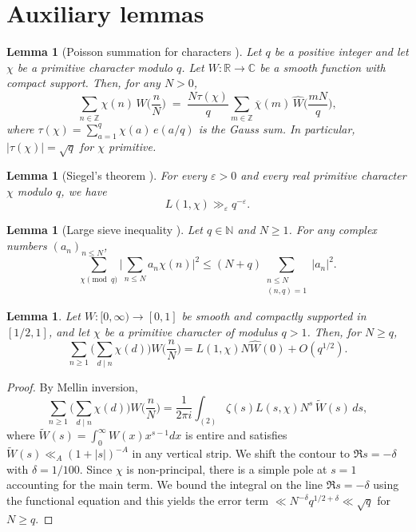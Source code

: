 \documentclass[11pt]{amsart}
\newtheorem{lemma}[theorem]{Lemma}
\newcommand{\eps}{\varepsilon}
\begin{document}
\section{Auxiliary lemmas}

\begin{lemma}[Poisson summation for characters {\cite[Exercise~5 \& Lemma~3.1]{IK}}]\label{lem:poisson}
Let $q$ be a positive integer and let $\chi$ be a primitive character modulo $q$.
Let $W \colon \mathbb{R} \to \mathbb{C}$ be a smooth function with compact support.
Then, for any $N > 0$,
\[
\sum_{n \in \mathbb{Z}} \chi(n)\, W\!\biggl(\frac{n}{N}\biggr)
\;=\;
\frac{N \tau(\chi)}{q}
\sum_{m \in \mathbb{Z}} \overline{\chi}(m)\, \widehat{W}\!\biggl(\frac{mN}{q}\biggr),
\]
where $\tau(\chi) = \sum_{a=1}^{q} \chi(a)\, e(a/q)$ is the Gauss sum.
In particular, $|\tau(\chi)| = \sqrt{q}$ for $\chi$ primitive.
\end{lemma}
 
\begin{lemma}[Siegel's theorem {\cite[Theorem~11.14]{MV}}]\label{lem:siegel}
For every $\eps > 0$ and every real primitive character $\chi$ modulo $q$, we have
\[
L(1,\chi) \gg_\eps q^{-\eps}.
\]
\end{lemma}

\begin{lemma}[Large sieve inequality {\cite[Section~7.5]{IK}}]\label{lem:largesieve}
Let $q \in \mathbb{N}$ and $N \geq 1$. For any complex numbers $(a_n)_{n \leq N}$,
\[
\sum_{\chi \pmod{q}} \biggl| \sum_{n \leq N} a_n \chi(n) \biggr|^2
\leq (N + q) \sum_{\substack{n \leq N \\ (n,q) = 1}} |a_n|^2.
\]
\end{lemma}

\begin{lemma} \label{le:hyperbola}
  Let $W : [0, \infty) \to [0,1]$ be smooth and compactly supported in $[1/2, 1]$,
  and let $\chi$ be a primitive character of modulus $q > 1$. Then, for $N \geq q$, 
  $$
    \sum_{n \geq 1} \Big( \sum_{d \mid n} \chi(d) \Big) W\!\Big( \frac{n}{N} \Big)
    = L(1, \chi) N \widehat{W}(0) + O(q^{1/2}).
  $$
\end{lemma}

\begin{proof}
  By Mellin inversion,
  $$
    \sum_{n \geq 1} \Big( \sum_{d \mid n} \chi(d) \Big) W\!\Big( \frac{n}{N} \Big)
    = \frac{1}{2\pi i} \int_{(2)} \zeta(s) L(s, \chi) N^{s}\, \widetilde{W}(s)\, ds,
  $$
  where $\widetilde{W}(s) = \int_0^\infty W(x) x^{s-1} dx$ is entire and satisfies
  $\widetilde{W}(s) \ll_A (1+|s|)^{-A}$ in any vertical strip. We shift the contour to $\Re s = - \delta$ with $\delta = 1 / 100$. Since $\chi$ is non-principal, there is a simple pole at $s = 1$ accounting for the main term. We bound the integral on the line $\Re s = -\delta$ using the functional equation and this yields the error term $\ll N^{-\delta} q^{1/2 + \delta} \ll \sqrt{q}$ for $N \geq q$.  
\end{proof}
\end{document}
